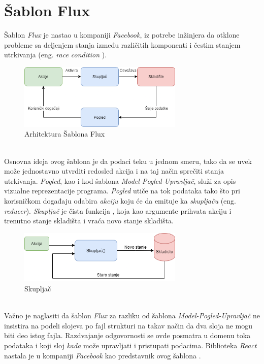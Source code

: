 \documentclass[12pt,oneside]{memoir}
\begin{document}
\section{Šablon Flux}
Šablon \emph{Flux} je nastao u kompaniji \emph{Facebook}, iz potrebe inžinjera da otklone probleme sa 
deljenjem stanja između različitih komponenti i čestim stanjem utrkivanja (eng. \emph{race condition} \cite{raceCondition}).
\begin{figure}[!ht]
  \centering
  \includegraphics[width=0.7\textwidth]{slike/FLUX_pattern.png}
  \caption{Arhitektura Šablona Flux}
  \label{fig:flux}
\end{figure}
\\
Osnovna ideja ovog šablona je da podaci teku u jednom smeru, tako da se uvek može jednostavno
utvrditi redosled akcija i na taj način sprečiti stanja utrkivanja.
\emph{Pogled}, kao i kod šablona \emph{Model-Pogled-Upravljač}, služi za opis vizualne reprezentacije programa.
\emph{Pogled} utiče na tok podataka tako što pri korisničkom događaju odabira \emph{akciju} koju će da emituje
ka \emph{skupljaču} (eng. \emph{reducer}). \emph{Skupljač} je čista funkcija \cite{functionalProgramming}, koja kao argumente
prihvata akciju i trenutno stanje skladišta i vraća novo stanje skladišta.
\begin{figure}[!ht]
  \centering
  \includegraphics[width=0.7\textwidth]{slike/Reducer.png}
  \caption{Skupljač}
  \label{fig:reducer}
\end{figure}
\\
Važno je naglasiti da šablon \emph{Flux} za razliku od šablona \emph{Model-Pogled-Upravljač} ne insistira
na podeli slojeva po fajl strukturi na takav način da dva sloja ne mogu biti deo istog fajla.
Razdvajanje odgovornosti se ovde posmatra u domenu toka podataka i koji sloj \emph{kada} može
upravljati i pristupati podacima. Biblioteka \emph{React} nastala je u kompaniji \emph{Facebook} kao predstavnik ovog šablona \cite{React}.
\end{document}
